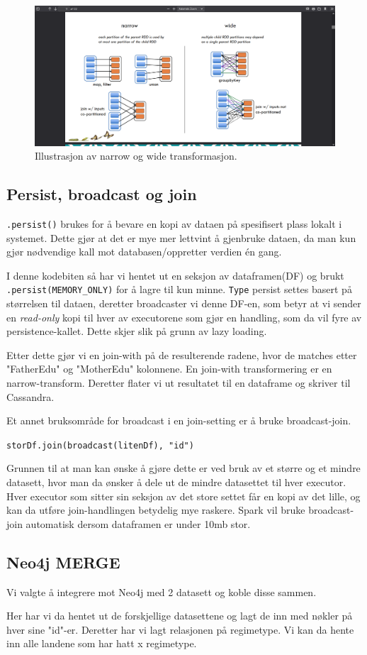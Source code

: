 \begin{figure}[H]
    \centering
    \includegraphics[scale=0.3]{images/milepael6/transformActionPic.png}
    \caption{Illustrasjon av narrow og wide transformasjon.}
\end{figure}

\subsection{Persist, broadcast og join}
\lstinline{.persist()} brukes for å bevare en kopi av dataen på spesifisert plass lokalt i systemet. Dette gjør at det er mye mer lettvint å gjenbruke dataen, da man kun gjør nødvendige kall mot databasen/oppretter verdien én gang.


I denne kodebiten så har vi hentet ut en seksjon av dataframen(DF) og brukt \lstinline{.persist(MEMORY_ONLY)} for å lagre til kun minne. \lstinline{Type} persist settes basert på størrelsen til dataen, deretter broadcaster vi denne DF-en, som betyr at vi sender en \textit{read-only} kopi til hver av executorene som gjør en handling, som da vil fyre av persistence-kallet. Dette skjer slik på grunn av lazy loading.

Etter dette gjør vi en join-with på de resulterende radene, hvor de matches etter "FatherEdu" og "MotherEdu" kolonnene. En join-with transformering er en narrow-transform. Deretter flater vi ut resultatet til en dataframe og skriver til Cassandra.

Et annet bruksområde for broadcast i en join-setting er å bruke broadcast-join.

\lstinline {storDf.join(broadcast(litenDf), "id")}

Grunnen til at man kan ønske å gjøre dette er ved bruk av et større og et mindre datasett, hvor man da ønsker å dele ut de mindre datasettet til hver executor. Hver executor som sitter sin seksjon av det store settet får en kopi av det lille, og kan da utføre join-handlingen betydelig mye raskere. Spark vil bruke broadcast-join automatisk dersom dataframen er under 10mb stor.

\subsection{Neo4j MERGE}
Vi valgte å integrere mot Neo4j med 2 datasett og koble disse sammen.

Her har vi da hentet ut de forskjellige datasettene og lagt de inn med nøkler på hver sine "id"-er. Deretter har vi lagt relasjonen på regimetype. Vi kan da hente inn alle landene som har hatt x regimetype.